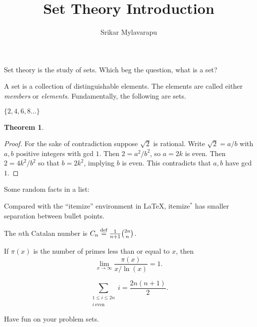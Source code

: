 \documentclass[12pt]{article}
\author{Srikar Mylavarapu}
\title{Set Theory Introduction}
\newenvironment{itemize*}%
  {\vspace{-2ex} \begin{itemize} %
     \setlength{\itemsep}{-1ex} \setlength{\parsep}{0pt}}%
  {\end{itemize}}
\newcommand{\eqdef}{\mathbin{\stackrel{\rm def}{=}}}
\newtheorem{theorem}{Theorem}
\begin{document}
\maketitle

Set theory is the study of sets. Which beg the question, what is a set?

A set is a collection of distinguishable elements. The elements are called either \emph{members} or \emph{elements}. Fundamentally, the following are sets.

$\{2, 4, 6, 8\dots\}$

\begin{theorem}

\end{theorem}


\begin{proof}
For the sake of contradiction suppose $\sqrt{2}$ is rational. Write $\sqrt{2} = a/b$ with $a,b$ positive integers with gcd $1$. Then $2 = a^2/b^2$, so $a = 2k$ is even. Then $2 = 4k^2/b^2$ so that $b = 2k^2$, implying $b$ is even. This contradicts that $a,b$ have gcd $1$.
\end{proof}

Some random facts in a list:

\begin{itemize*}
\item Compared with the ``itemize'' environment in \LaTeX, itemize$^*$ has smaller separation between bullet points.
\item The $n$th Catalan number is $C_n \eqdef \frac{1}{n+1} \binom{2n}{n}$.
\item If $\pi(x)$ is the number of primes less than or equal to $x$, then
$$\lim_{x\rightarrow\infty} \frac{\pi(x)}{x/\ln(x)} = 1 . $$
\item $$ \sum_{\substack{1\le i\le 2n\\i\ \mathrm{even}}} i = \frac{2n(n+1)}2 .$$
\end{itemize*}

Have fun on your problem sets.
\end{document}
